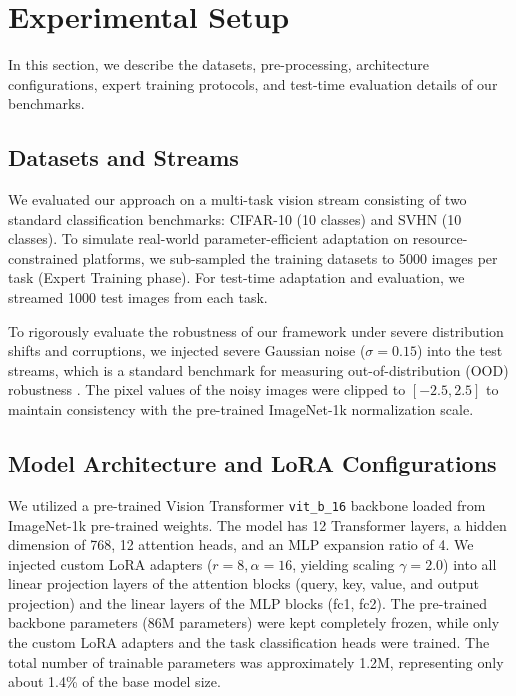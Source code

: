 \documentclass{article}
\begin{document}
\section{Experimental Setup}
\label{experimental_setup}

In this section, we describe the datasets, pre-processing, architecture configurations, expert training protocols, and test-time evaluation details of our benchmarks.

\subsection{Datasets and Streams}
We evaluated our approach on a multi-task vision stream consisting of two standard classification benchmarks: CIFAR-10 \cite{krizhevsky2009learning} (10 classes) and SVHN \cite{netzer2011reading} (10 classes). To simulate real-world parameter-efficient adaptation on resource-constrained platforms, we sub-sampled the training datasets to 5000 images per task (Expert Training phase). For test-time adaptation and evaluation, we streamed 1000 test images from each task.

To rigorously evaluate the robustness of our framework under severe distribution shifts and corruptions, we injected severe Gaussian noise ($\sigma = 0.15$) into the test streams, which is a standard benchmark for measuring out-of-distribution (OOD) robustness \cite{hendrycks2019robustness}. The pixel values of the noisy images were clipped to $[-2.5, 2.5]$ to maintain consistency with the pre-trained ImageNet-1k normalization scale.

\subsection{Model Architecture and LoRA Configurations}
We utilized a pre-trained Vision Transformer \texttt{vit\_b\_16} backbone \cite{dosovitskiy2020vit} loaded from ImageNet-1k pre-trained weights. The model has 12 Transformer layers, a hidden dimension of 768, 12 attention heads, and an MLP expansion ratio of 4. We injected custom LoRA adapters ($r=8, \alpha=16$, yielding scaling $\gamma = 2.0$) into all linear projection layers of the attention blocks (query, key, value, and output projection) and the linear layers of the MLP blocks (fc1, fc2). The pre-trained backbone parameters (86M parameters) were kept completely frozen, while only the custom LoRA adapters and the task classification heads were trained. The total number of trainable parameters was approximately 1.2M, representing only about 1.4\% of the base model size.
\end{document}
